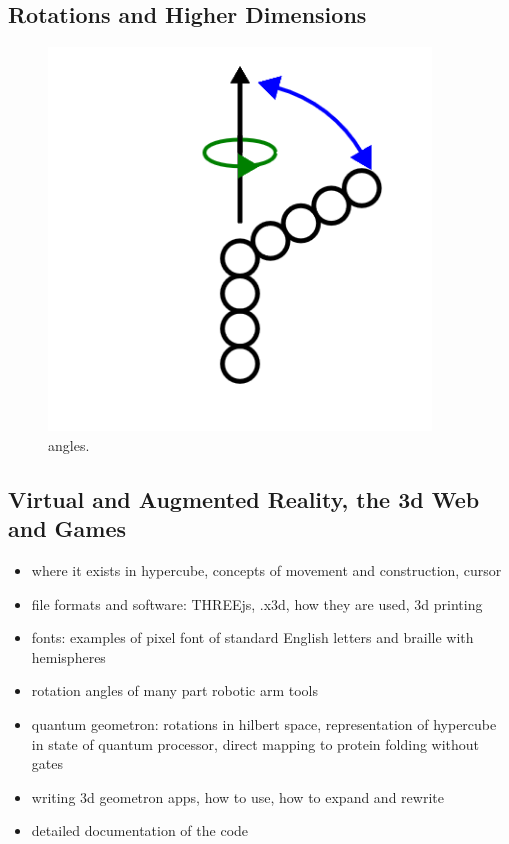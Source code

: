 \subsection{Rotations and Higher Dimensions}



\begin{figure}
	\centering
	\includegraphics[width=4in]{figures/geometron3d/angles.png}
	\caption[angles]
	{angles.}
\end{figure}

\subsection{Virtual and Augmented Reality, the 3d Web and Games}

\begin{itemize}
\tightlist
\item
  where it exists in hypercube, concepts of movement and construction, cursor
\item
  file formats and software: THREEjs, .x3d, how they are used, 3d printing
\item
  fonts: examples of pixel font of standard English letters and braille with hemispheres
\item
  rotation angles of many part robotic arm tools
\item
  quantum geometron: rotations in hilbert space, representation of hypercube in state of quantum processor, direct mapping to protein folding without gates 
\item
  writing 3d geometron apps, how to use, how to expand and rewrite
\item 
  detailed documentation of the code
\end{itemize}